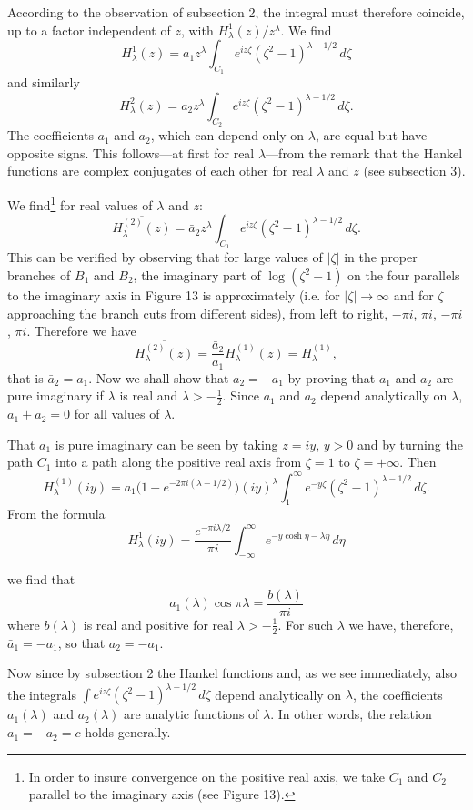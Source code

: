 According to the observation of subsection 2, the integral must therefore coincide, up to a factor independent of $z$, with $H_\lambda^1(z)/z^\lambda$. We find
\[
H_\lambda^1(z)=a_1z^\lambda\int_{C_1}e^{iz\zeta}(\zeta^2-1)^{\lambda-1/2}\,d\zeta
\]
and similarly
\[
H_\lambda^2(z)=a_2z^\lambda\int_{C_2}e^{iz\zeta}(\zeta^2-1)^{\lambda-1/2}\,d\zeta.
\]
The coefficients $a_1$ and $a_2$, which can depend only on $\lambda$, are equal but have opposite signs. This follows---at first for real $\lambda$---from the remark that the Hankel functions are complex conjugates of each other for real $\lambda$ and $z$ (see subsection 3).

We find\footnote{In order to insure convergence on the positive real axis, we take $C_1$ and $C_2$ parallel to the imaginary axis (see Figure 13).} for real values of $\lambda$ and $z$:
\[
\overline{H_\lambda^{(2)}(z)}=\bar a_2z^\lambda\int_{C_1}e^{iz\zeta}(\zeta^2-1)^{\lambda-1/2}\,d\zeta.
\]
This can be verified by observing that for large values of $|\zeta|$ in the proper branches of $B_1$ and $B_2$, the imaginary part of $\log(\zeta^2-1)$ on the four parallels to the imaginary axis in Figure 13 is approximately (i.e. for $|\zeta|\to\infty$ and for $\zeta$ approaching the branch cuts from different sides), from left to right, $-\pi i$, $\pi i$, $-\pi i$, $\pi i$. Therefore we have
\[
\overline{H_\lambda^{(2)}(z)}=\frac{\bar a_2}{a_1}H_\lambda^{(1)}(z)=H_\lambda^{(1)},
\]
that is $\bar a_2=a_1$. Now we shall show that $a_2=-a_1$ by proving that $a_1$ and $a_2$ are pure imaginary if $\lambda$ is real and $\lambda>-\tfrac12$. Since $a_1$ and $a_2$ depend analytically on $\lambda$, $a_1+a_2=0$ for all values of $\lambda$.

That $a_1$ is pure imaginary can be seen by taking $z=iy$, $y>0$ and by turning the path $C_1$ into a path along the positive real axis from $\zeta=1$ to $\zeta=+\infty$. Then
\[
H_\lambda^{(1)}(iy)=a_1\bigl(1-e^{-2\pi i(\lambda-1/2)}\bigr)(iy)^\lambda
\int_1^\infty e^{-y\zeta}(\zeta^2-1)^{\lambda-1/2}\,d\zeta.
\]
From the formula
\[
H_\lambda^1(iy)=\frac{e^{-\pi i\lambda/2}}{\pi i}\int_{-\infty}^{\infty}e^{-y\cosh\eta-\lambda\eta}\,d\eta
\]

we find that
\[
a_1(\lambda)\cos\pi\lambda=\frac{b(\lambda)}{\pi i}
\]
where $b(\lambda)$ is real and positive for real $\lambda>-\tfrac12$. For such $\lambda$ we have, therefore, $\bar a_1=-a_1$, so that $a_2=-a_1$.

Now since by subsection 2 the Hankel functions and, as we see immediately, also the integrals $\int e^{iz\zeta}(\zeta^2-1)^{\lambda-1/2}\,d\zeta$ depend analytically on $\lambda$, the coefficients $a_1(\lambda)$ and $a_2(\lambda)$ are analytic functions of $\lambda$. In other words, the relation $a_1=-a_2=c$ holds generally.

